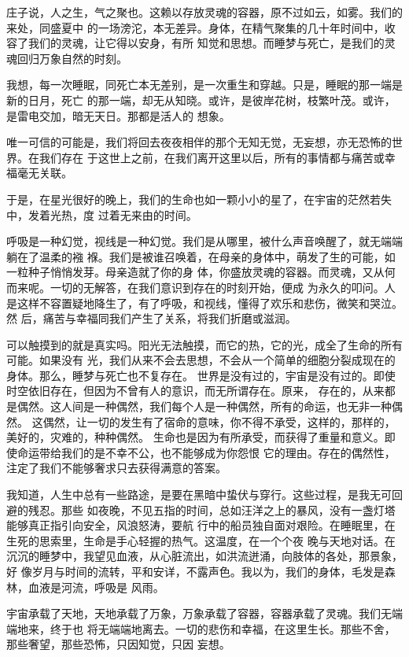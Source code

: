 		庄子说，人之生，气之聚也。这赖以存放灵魂的容器，原不过如云，如雾。我们的来处，同盛夏中
	的一场滂沱，本无差异。身体，在精气聚集的几十年时间中，收容了我们的灵魂，让它得以安身，有所
	知觉和思想。而睡梦与死亡，是我们的灵魂回归万象自然的时刻。

		我想，每一次睡眠，同死亡本无差别，是一次重生和穿越。只是，睡眠的那一端是新的日月，死亡
	的那一端，却无从知晓。或许，是彼岸花树，枝繁叶茂。或许，是雷电交加，暗无天日。那都是活人的
	想象。

		唯一可信的可能是，我们将回去夜夜相伴的那个无知无觉，无妄想，亦无恐怖的世界。在我们存在
	于这世上之前，在我们离开这里以后，所有的事情都与痛苦或幸福毫无关联。


		于是，在星光很好的晚上，我们的生命也如一颗小小的星了，在宇宙的茫然若失中，发着光热，度
	过着无来由的时间。

		呼吸是一种幻觉，视线是一种幻觉。我们是从哪里，被什么声音唤醒了，就无端端躺在了温柔的襁
	褓。我们是被谁召唤着，在母亲的身体中，萌发了生的可能，如一粒种子悄悄发芽。母亲造就了你的身
	体，你盛放灵魂的容器。而灵魂，又从何而来呢。一切的无解答，在我们意识到存在的时刻开始，便成
	为永久的叩问。人是这样不容置疑地降生了，有了呼吸，和视线，懂得了欢乐和悲伤，微笑和哭泣。然
	后，痛苦与幸福同我们产生了关系，将我们折磨或滋润。


		可以触摸到的就是真实吗。阳光无法触摸，而它的热，它的光，成全了生命的所有可能。如果没有
	光，我们从来不会去思想，不会从一个简单的细胞分裂成现在的身体。那么，睡梦与死亡也不复存在。
	世界是没有过的，宇宙是没有过的。即使时空依旧存在，但因为不曾有人的意识，而无所谓存在。原来，
	存在的，从来都是偶然。这人间是一种偶然，我们每个人是一种偶然，所有的命运，也无非一种偶然。
	这偶然，让一切的发生有了宿命的意味，你不得不承受，这样的，那样的，美好的，灾难的，种种偶然。
	生命也是因为有所承受，而获得了重量和意义。即使命运带给我们的是不幸不公，也不能够成为你怨恨
	它的理由。存在的偶然性，注定了我们不能够奢求只去获得满意的答案。


		我知道，人生中总有一些路途，是要在黑暗中蛰伏与穿行。这些过程，是我无可回避的残忍。那些
	如夜晚，不见五指的时间，总如汪洋之上的暴风，没有一盏灯塔能够真正指引向安全，风浪怒涛，要航
	行中的船员独自面对艰险。在睡眠里，在生死的思索里，生命是手心轻握的热气。这温度，在一个个夜
	晚与天地对话。在沉沉的睡梦中，我望见血液，从心脏流出，如洪流迸涌，向肢体的各处，那景象，好
	像岁月与时间的流转，平和安详，不露声色。我以为，我们的身体，毛发是森林，血液是河流，呼吸是
	风雨。


		宇宙承载了天地，天地承载了万象，万象承载了容器，容器承载了灵魂。我们无端端地来，终于也
	将无端端地离去。一切的悲伤和幸福，在这里生长。那些不舍，那些奢望，那些恐怖，只因知觉，只因
	妄想。

